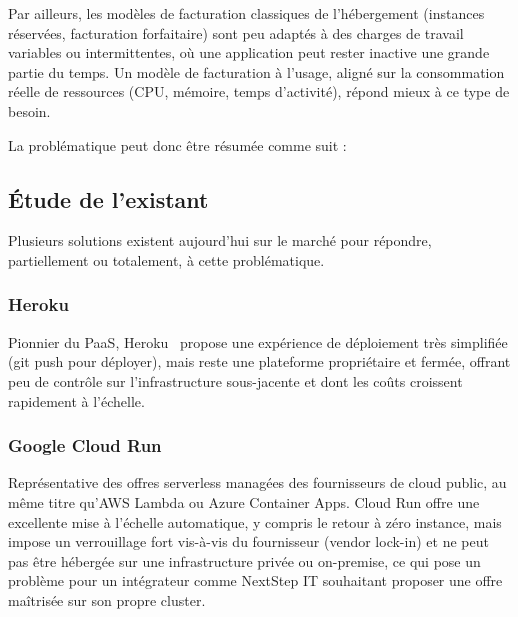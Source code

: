 \vspace{0.3cm}

Par ailleurs, les modèles de facturation classiques de l'hébergement (instances réservées, facturation forfaitaire) sont peu adaptés à des charges de travail variables ou intermittentes, où une application peut rester inactive une grande partie du temps. Un modèle de facturation à l'usage, aligné sur la consommation réelle de ressources (CPU, mémoire, temps d'activité), répond mieux à ce type de besoin.

\vspace{0.5cm}

\noindent La problématique peut donc être résumée comme suit :

\vspace{0.3cm}

\begin{center}
\end{center}

\clearpage
\subsection{Étude de l'existant}

Plusieurs solutions existent aujourd'hui sur le marché pour répondre, partiellement ou totalement, à cette problématique.

\subsubsection*{Heroku}
Pionnier du PaaS, Heroku~\cite{Heroku} propose une expérience de déploiement très simplifiée (git push pour déployer), mais reste une plateforme propriétaire et fermée, offrant peu de contrôle sur l'infrastructure sous-jacente et dont les coûts croissent rapidement à l'échelle.

\subsubsection*{Google Cloud Run}
Représentative des offres serverless managées des fournisseurs de cloud public, au même titre qu'AWS Lambda ou Azure Container Apps. Cloud Run offre une excellente mise à l'échelle automatique, y compris le retour à zéro instance, mais impose un verrouillage fort vis-à-vis du fournisseur (vendor lock-in) et ne peut pas être hébergée sur une infrastructure privée ou on-premise, ce qui pose un problème pour un intégrateur comme NextStep IT souhaitant proposer une offre maîtrisée sur son propre cluster.

